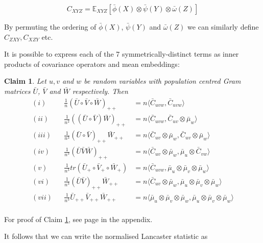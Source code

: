 \documentclass[12pt]{article}
\newtheorem{claim}{Claim}
\numberwithin{claim}{section}
\numberwithin{lemma}{section}
\numberwithin{theorem}{section}
\begin{document}
\[C_{XYZ} = \mathbb{E}_{XYZ}[ \bar{\phi}(X) \otimes \bar{\psi}(Y) \otimes \bar{\omega}(Z)]\]

By permuting the ordering of $\bar{\phi}(X)$, $\bar{\psi}(Y)$ and $\bar{\omega}(Z)$ we can similarly define $C_{ZXY}, C_{XZY}$ etc.

It is possible to express each of the 7 symmetrically-distinct terms as inner products of covariance operators and mean embeddings:

\begin{claim}\label{claim:covarianceip}
Let $u, v$ and $w$ be random variables with population centred Gram matrices $\bar{U}$, $\bar{V}$ and $\bar{W}$ respectively. Then
\begin{align*}
(i) && \frac{1}{n}(\bar{U}\circ \bar{V} \circ \bar{W})_{++} &= n\langle \bar{C}_{uvw},\bar{C}_{uvw} \rangle \\
(ii) && \frac{1}{n^2}((\bar{U}\circ \bar{V})\bar{W})_{++} &= n\langle \bar{C}_{uvw},\bar{C}_{uv}\otimes \bar{\mu}_w \rangle \\
(iii) && \frac{1}{n^3}(\bar{U}\circ \bar{V})_{++}\bar{W}_{++} &= n\langle \bar{C}_{uv}\otimes \bar{\mu}_w,\bar{C}_{uv}\otimes \bar{\mu}_w \rangle \\
(iv) && \frac{1}{n^3}(\bar{U}\bar{V}\bar{W})_{++} &= n\langle \bar{C}_{uv}\otimes \bar{\mu}_w,\bar{\mu}_u \otimes \bar{C}_{vw} \rangle \\
(v) && \frac{1}{n^3}tr(\bar{U}_+\circ \bar{V}_+ \circ \bar{W}_+) &= n\langle \bar{C}_{uvw} ,\bar{\mu}_u \otimes \bar{\mu}_v \otimes \bar{\mu}_w \rangle \\
(vi) && \frac{1}{n^3}(\bar{U}\bar{V})_{++}\bar{W}_{++} &= n\langle \bar{C}_{uv}\otimes \bar{\mu}_w,\bar{\mu}_u \otimes \bar{\mu}_v \otimes \bar{\mu}_w \rangle \\
(vii) && \frac{1}{n^3}\bar{U}_{++}\bar{V}_{++}\bar{W}_{++} &= n\langle \bar{\mu}_u \otimes \bar{\mu}_v \otimes \bar{\mu}_w,\bar{\mu}_u \otimes \bar{\mu}_v \otimes \bar{\mu}_w \rangle \\
\end{align*}
\end{claim}

For proof of Claim \ref{claim:covarianceip}, see page \pageref{proof:gram2cov} in the appendix.

It follows that we can write the normalised Lancaster statistic as
\end{document}
